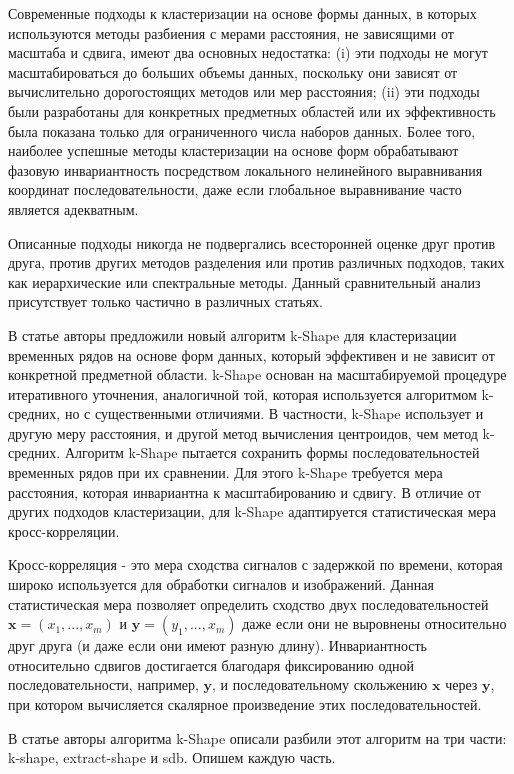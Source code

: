 Современные подходы к кластеризации на основе формы данных,
в которых используются методы разбиения с мерами расстояния,
не зависящими от масштаба и сдвига, имеют два основных недостатка:
(i) эти подходы не могут масштабироваться до больших объемы данных, поскольку они зависят 
от вычислительно дорогостоящих методов или мер расстояния; 
(ii) эти подходы были разработаны для конкретных предметных областей или их эффективность была
показана только для ограниченного числа наборов данных. 
Более того, наиболее успешные методы кластеризации на основе форм обрабатывают 
фазовую инвариантность посредством локального нелинейного выравнивания координат 
последовательности, даже если глобальное выравнивание часто является адекватным. 

Описанные подходы никогда не подвергались
всесторонней оценке друг против друга, против других методов разделения или против различных подходов, 
таких как иерархические или спектральные методы.
Данный сравнительный анализ присутствует только частично в различных статьях.

В статье \cite{k-shape} авторы предложили новый алгоритм k-Shape для кластеризации временных рядов на основе форм данных, 
который эффективен и не зависит от конкретной предметной области.
k-Shape основан на масштабируемой процедуре итеративного уточнения, 
аналогичной той, которая используется алгоритмом k-средних, но с существенными отличиями. 
В частности, k-Shape использует и другую меру расстояния, и другой метод вычисления центроидов, чем метод k-средних.
Алгоритм k-Shape пытается сохранить формы последовательностей временных рядов при их сравнении. 
Для этого k-Shape требуется мера расстояния, которая инвариантна к масштабированию и сдвигу.
В отличие от других подходов кластеризации,
для k-Shape адаптируется статистическая мера кросс-корреляции.

Кросс-корреляция - это мера сходства сигналов с задержкой по времени,
которая широко используется для обработки сигналов и изображений.
Данная статистическая мера позволяет определить сходство
двух последовательностей $\textbf{x} = (x_1, ..., x_m)$
и $\textbf{y} = (y_1, ..., x_m)$ даже если они не выровнены
относительно друг друга (и даже если они имеют разную длину).
Инвариантность относительно сдвигов
достигается благодаря фиксированию
одной последовательности, например, $\textbf{y}$,
и последовательному скольжению $\textbf{x}$ через $\textbf{y}$,
при котором вычисляется скалярное произведение этих последовательностей.

В статье \cite{k-shape} авторы алгоритма k-Shape описали разбили этот алгоритм на три части:
k-shape, extract-shape и sdb. Опишем каждую часть.

